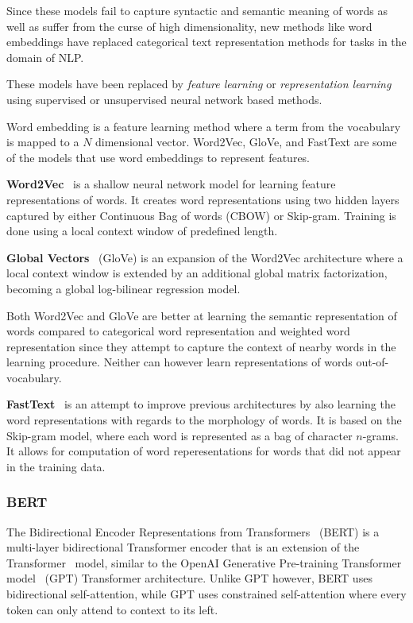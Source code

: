 \documentclass[oneside, english, bibtex]{kththesis}
\begin{document}
Since these models fail to capture syntactic and semantic meaning of words as well as suffer from the curse of high dimensionality, new methods like word embeddings have replaced categorical text representation methods for tasks in the domain of NLP.

These models have been replaced by \textit{feature learning} or \textit{representation learning} using supervised or unsupervised neural network based methods.

Word embedding is a feature learning method where a term from the vocabulary is mapped to a $N$ dimensional vector. Word2Vec, GloVe, and FastText are some of the models that use word embeddings to represent features.

\textbf{Word2Vec}~\cite{mikolov2013} is a shallow neural network model for learning feature representations of words. It creates word representations using two hidden layers captured by either Continuous Bag of words (CBOW) or Skip-gram. Training is done using a local context window of predefined length. 

\textbf{Global Vectors}~\cite{pennington2014glove} (GloVe) is an expansion of the Word2Vec architecture where a local context window is extended by an additional global matrix factorization, becoming a global log-bilinear regression model.

Both Word2Vec and GloVe are better at learning the semantic representation of words compared to categorical word representation and weighted word representation since they attempt to capture the context of nearby words in the learning procedure. Neither can however learn representations of words out-of-vocabulary. 

\textbf{FastText}~\cite{DBLP:journals/corr/BojanowskiGJM16} is an attempt to improve previous architectures by also learning the word representations with regards to the morphology of words. It is based on the Skip-gram model, where each word is represented as a bag of character $n$-grams. It allows for computation of word reperesentations for words that did not appear in the training data. 

\subsubsection{BERT}

The Bidirectional Encoder Representations from Transformers~\cite{devlin2018bert} (BERT) is a multi-layer bidirectional Transformer encoder that is an extension of the Transformer~\cite{46201} model, similar to the OpenAI Generative Pre-training Transformer model~\cite{radford2018improving}  (GPT) Transformer architecture. Unlike GPT however, BERT uses bidirectional self-attention, while GPT uses constrained self-attention where every token can only attend to context to its left.
\end{document}
